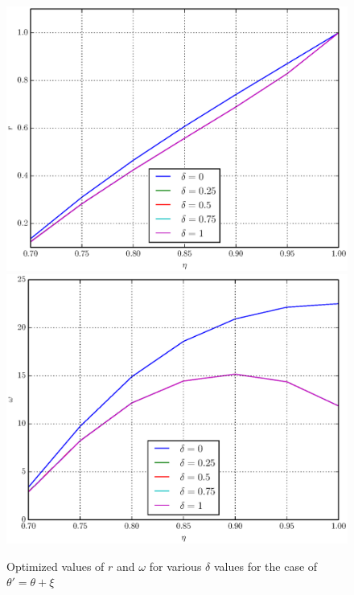 \documentclass[%
master,         %
subf,           %
href,           %
colorlinks=true %
]{disser}
\numberwithin{equation}{section}
\numberwithin{figure}{section}
\begin{document}
\begin{figure}[h]
\includegraphics[scale=0.7]{r_ang.eps}
\includegraphics[scale=0.7]{omega_ang.eps}
\caption{Optimized values of $r$ and $\omega$ for various $\delta$ values for the case of $\theta' = \theta + \xi$}
\label{fig:psi_ang}
\end{figure}
\end{document}
